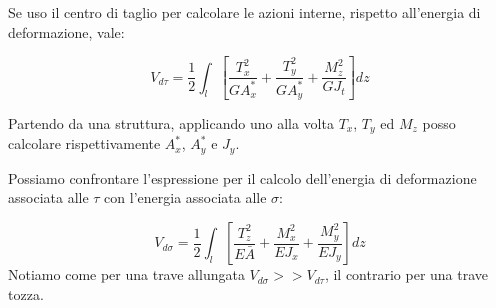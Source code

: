 Se uso il centro di taglio per calcolare le azioni interne, rispetto all'energia di deformazione, vale:

\begin{equation*}
    V_{d\tau}= \frac{1}{2} \int_l 
    \left[
        \frac{T_x^2}{G A^*_x} 
        + \frac{T_y^2}{G A^*_y} 
        + \frac{M_z^2}{G J_t}
    \right] dz
\end{equation*}

Partendo da una struttura, applicando uno alla volta $T_x$, $T_y$ ed $M_z$ posso calcolare rispettivamente $A^*_x$, $A^*_y$ e $J_y$.

Possiamo confrontare l'espressione per il calcolo dell'energia di deformazione associata alle $\tau$ con l'energia associata alle $\sigma$:

\begin{equation*}
    V_{d\sigma}= \frac{1}{2} \int_l 
    \left[
        \frac{T_z^2}{E\bar{A}} 
        + \frac{M_x^2}{E J_x}
        + \frac{M_y^2}{E J_y}
    \right] dz
\end{equation*}
Notiamo come per una trave allungata $V_{d\sigma}>>V_{d\tau}$, il contrario per una trave tozza.
